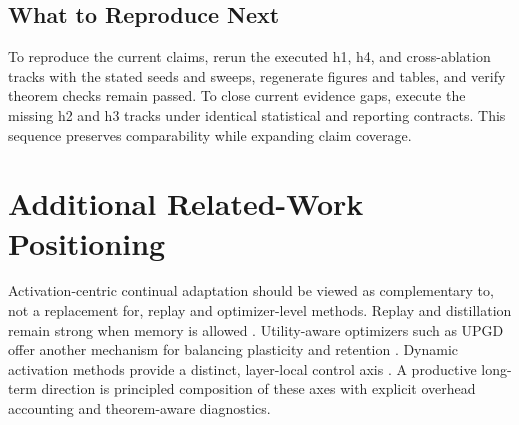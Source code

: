 \documentclass{article} %
\begin{document}
\subsection{What to Reproduce Next}
To reproduce the current claims, rerun the executed h1, h4, and cross-ablation tracks with the stated seeds and sweeps, regenerate figures and tables, and verify theorem checks remain passed. To close current evidence gaps, execute the missing h2 and h3 tracks under identical statistical and reporting contracts. This sequence preserves comparability while expanding claim coverage.

\section{Additional Related-Work Positioning}
Activation-centric continual adaptation should be viewed as complementary to, not a replacement for, replay and optimizer-level methods. Replay and distillation remain strong when memory is allowed \citep{s3,s4,s14,s36}. Utility-aware optimizers such as UPGD offer another mechanism for balancing plasticity and retention \citep{s38}. Dynamic activation methods provide a distinct, layer-local control axis \citep{s20,s26,s27}. A productive long-term direction is principled composition of these axes with explicit overhead accounting and theorem-aware diagnostics.
\end{document}

